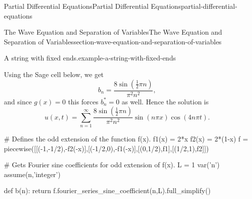 \documentclass[oneside,10pt,]{book}
\numberwithin{equation}{section}
\begin{document}
\begin{chapterptx}{Partial Differential Equations}{}{Partial Differential Equations}{}{}{partial-differential-equations}
\begin{sectionptx}{The Wave Equation and Separation of Variables}{}{The Wave Equation and Separation of Variables}{}{}{section-wave-equation-and-separation-of-variables}
\begin{example}{A string with fixed ends.}{example-a-string-with-fixed-ends}
\par
\hypertarget{p-668}{}%
Using the Sage cell below, we get%
\begin{equation*}
b_{n} = \frac{8\sin\left(\frac{1}{2} \pi n\right)}{\pi^{2} n^{2}},
\end{equation*}
and since \(g(x) = 0\) this forces \(b^{*}_{n} = 0\) as well. Hence the solution is%
\begin{equation*}
u(x,t) = \sum_{n=1}^{\infty}\frac{8\sin\left(\frac{1}{2} \pi n\right)}{\pi^{2} n^{2}}\sin(n\pi x)\cos(4n\pi t).
\end{equation*}
%
\end{example}
\begin{sageinput}
# Defines the odd extension of the function f(x).
f1(x) = 2*x
f2(x) = 2*(1-x)
f = piecewise([[(-1,-1/2),-f2(-x)],[(-1/2,0),-f1(-x)],[(0,1/2),f1],[(1/2,1),f2]])

# Gets Fourier sine coefficients for odd extension of f(x).
L = 1
var('n')
assume(n,'integer')

def b(n):
  return f.fourier_series_sine_coefficient(n,L).full_simplify()


\end{sageinput}
\end{sectionptx}
\end{chapterptx}
\end{document}
